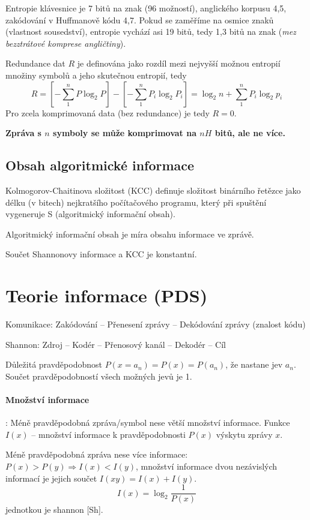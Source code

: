 \documentclass[a4paper, 11pt]{report}
\begin{document}
Entropie klávesnice je 7 bitů na znak (96 možností), anglického korpusu 4,5, zakódování v Huffmanově kódu 4,7. Pokud se zaměříme na osmice znaků (vlastnost sousedství), entropie vychází asi 19 bitů, tedy 1,3  bitů na znak (\emph{mez bezztrátové komprese angličtiny}).

Redundance dat $R$ je definována jako rozdíl mezi nejvyšší možnou entropií množiny symbolů a jeho skutečnou entropií, tedy
$$R = \left[ - \sum\limits_1^n P \log_2 P \right] - \left[ - \sum\limits_1^n P_i \log_2 P_i \right] = \log_2 n + \sum\limits_1^n P_i \log_2 p_i $$
Pro zcela komprimovaná data (bez redundance) je tedy $R=0$.

\textbf{Zpráva s $n$ symboly se může komprimovat na $nH$ bitů, ale ne více.}

\subsection{Obsah algoritmické informace}

Kolmogorov-Chaitinova složitost (KCC) definuje složitost binárního řetězce jako délku (v bitech) nejkratšího počítačového programu, který při spuštění vygeneruje S (algoritmický informační obsah).

Algoritmický informační obsah je míra obsahu informace ve zprávě.

Součet Shannonovy informace a KCC je konstantní.

\section{Teorie informace (PDS)}
Komunikace: Zakódování -- Přenesení zprávy -- Dekódování zprávy (znalost kódu)

Shannon: Zdroj -- Kodér -- Přenosový kanál -- Dekodér -- Cíl

Důležitá pravděpodobnost $P(x = a_n) = P(x) = P(a_n)$, že nastane jev $a_n$. Součet pravděpodobností všech možných jevů je 1.

\paragraph{Množství informace}: Méně pravděpodobná zpráva/symbol nese větší množství informace. Funkce $I(x)$ -- množství informace k pravděpodobnosti $P(x)$ výskytu zprávy $x$.

Méně pravděpodobná zpráva nese více informace: $P(x) > P(y) \Rightarrow I(x) < I(y)$, množství informace dvou nezávislých informací je jejich součet $I(xy) = I(x) + I(y)$.
$$I(x) = \log_2 \frac{1}{P(x)}$$
jednotkou je shannon [Sh].
\end{document}
